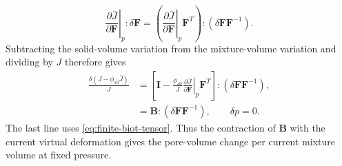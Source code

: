 \documentclass[11pt]{article}
\newcommand{\pder}[2]{\frac{\partial #1}{\partial #2}}
\begin{document}
\begin{equation}
 \left.\pder{\bar J}{\mathbf F}\right|_p:\delta\mathbf F
 =\left(\left.\pder{\bar J}{\mathbf F}\right|_p\mathbf F^T\right):
       (\delta\mathbf F\mathbf F^{-1}).
 \label{eq:pore-volume-gradient-spatial-contraction}
\end{equation}
Subtracting the solid-volume variation from the mixture-volume variation
and dividing by \(J\) therefore gives
\begin{align}
 \frac{\delta(J-\phi_{s0}\bar J)}J
 &=\left[\mathbf I-\frac{\phi_{s0}}J
       \left.\pder{\bar J}{\mathbf F}\right|_p\mathbf F^T\right]:
       (\delta\mathbf F\mathbf F^{-1}),
 \label{eq:pore-volume-variation-expanded}\\
 &=\mathbf B:(\delta\mathbf F\mathbf F^{-1}),\qquad \delta p=0.
 \label{eq:biot-pore-volume-variation}
\end{align}
The last line uses \eqref{eq:finite-biot-tensor}. Thus the contraction of
\(\mathbf B\) with the current virtual deformation gives the pore-volume
change per current mixture volume at fixed pressure.
\end{document}
